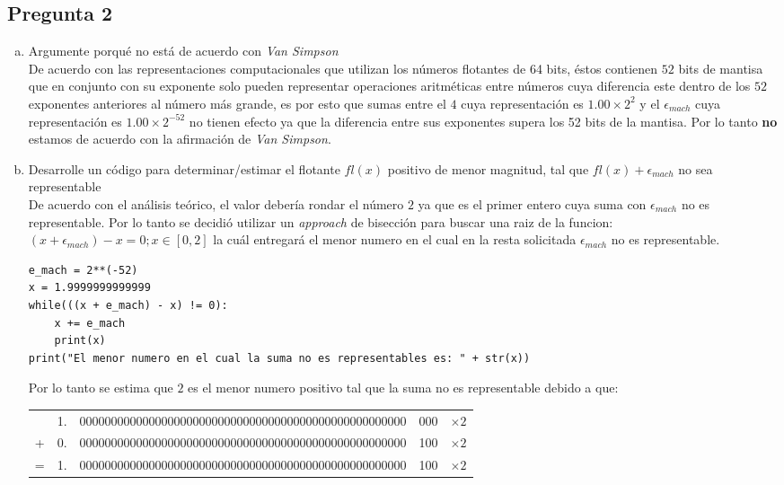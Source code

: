 \documentclass[10pt]{article}
\begin{document}
\subsection{Pregunta 2}
\begin{enumerate}[a)]
\item Argumente porqué no está de acuerdo con \textit{Van Simpson} \\
De acuerdo con las representaciones computacionales que utilizan los números flotantes de 64 bits, éstos contienen $52$ bits de mantisa que en conjunto con su exponente solo pueden representar operaciones aritméticas entre números cuya diferencia este dentro de los $52$ exponentes anteriores al número más grande, es por esto que sumas entre el $4$ cuya representación es $1.00 \times 2^{2}$ y el $\epsilon_{mach}$ cuya representación es $1.00 \times 2^{-52}$ no tienen efecto ya que la diferencia entre sus exponentes supera los 52 bits de la mantisa. Por lo tanto \textbf{no} estamos de acuerdo con la afirmación de \textit{Van Simpson}.

\item Desarrolle un código para determinar/estimar el flotante $fl(x)$ positivo de menor magnitud, tal que $fl(x) + \epsilon_{mach}$ no sea representable\\
De acuerdo con el análisis teórico, el valor debería rondar el número $2$ ya que es el primer entero cuya suma con $\epsilon_{mach}$ no es representable. Por lo tanto se decidió utilizar un \textit{approach} de bisección para buscar una raiz de la funcion: $(x + \epsilon_{mach}) - x = 0 ; x \in [0, 2]$ la cuál entregará el menor numero en el cual en la resta solicitada $\epsilon_{mach}$ no es representable.
\begin{verbatim}
e_mach = 2**(-52)
x = 1.9999999999999
while(((x + e_mach) - x) != 0):
	x += e_mach
	print(x)
print("El menor numero en el cual la suma no es representables es: " + str(x))
\end{verbatim}
Por lo tanto se estima que $2$ es el menor numero positivo tal que la suma no es representable debido a que:
\begin{center}
\begin{tabular}{c c | c | c | c}
 \cline{3-4}
 & 1. & 0000000000000000000000000000000000000000000000000000 & 000 & $\times 2$\\
 \cline{3-4}
 + & 0. & 0000000000000000000000000000000000000000000000000000 & 100 & $\times 2$\\
 \cline{1-5}
 = & 1. & 0000000000000000000000000000000000000000000000000000 & 100 & $\times 2$\\
 \cline{3-4}
\end{tabular}
\end{center}


\end{enumerate}
\end{document}
